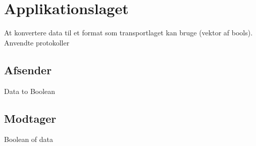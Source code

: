 \section{Applikationslaget}
At konvertere data til et format som transportlaget kan bruge (vektor af bools).
Anvendte protokoller

\subsection{Afsender}
Data to Boolean

\subsection{Modtager}
Boolean of data